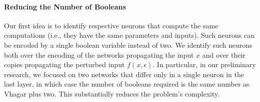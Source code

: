 \paragraph{Reducing the Number of Booleans}
Our first idea is to identify respective neurons that compute the same computations (i.e., they have the same parameters and inputs). 
Such neurons can be encoded by a single boolean variable instead of two. 
We identify such neurons both over the encoding of the networks propagating the input $x$ and over their copies propagating the perturbed input $f(x,\epsilon)$. 
In particular, in our preliminary research, we focused on two networks that differ only in a single neuron in the last layer, in which case the number of booleans required is the same number as Vhagar plus two. This substantially reduces the problem's complexity. 

